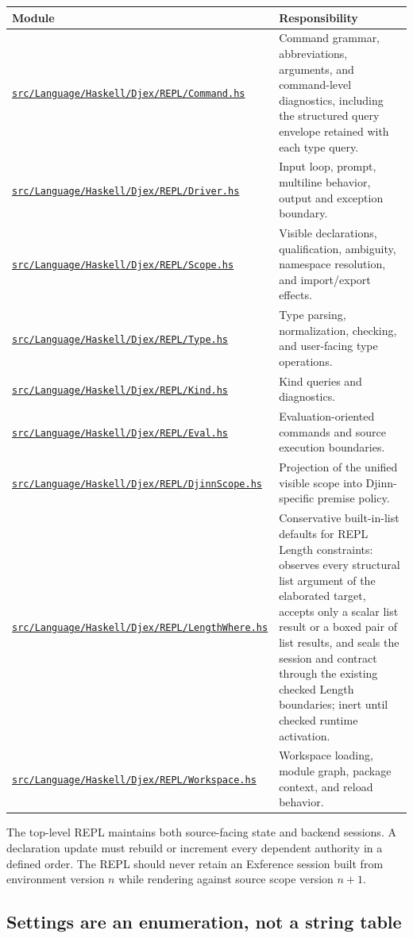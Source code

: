 \documentclass[10pt,letterpaper,oneside]{report}
\newcommand{\code}[1]{\texttt{\detokenize{#1}}}
\def\DjexBase{https://github.com/VladimirReshetnikov/Djex/blob/e454757d53ec057238c22fc6cd0d935b7d96b3dc/}
\newcommand{\dpath}[1]{\href{\DjexBase#1}{\nolinkurl{#1}}}
\begin{document}
\begin{longtable}{@{}L{0.31\textwidth}L{0.61\textwidth}@{}}
\toprule
\textbf{Module} & \textbf{Responsibility} \\
\midrule
\endhead
\dpath{src/Language/Haskell/Djex/REPL/Command.hs} & Command grammar, abbreviations, arguments, and command-level diagnostics, including the structured \code{-{}-where CLAUSE -{}- TYPE} query envelope retained with each type query. \\
\dpath{src/Language/Haskell/Djex/REPL/Driver.hs} & Input loop, prompt, multiline behavior, output and exception boundary. \\
\dpath{src/Language/Haskell/Djex/REPL/Scope.hs} & Visible declarations, qualification, ambiguity, namespace resolution, and import/export effects. \\
\dpath{src/Language/Haskell/Djex/REPL/Type.hs} & Type parsing, normalization, checking, and user-facing type operations. \\
\dpath{src/Language/Haskell/Djex/REPL/Kind.hs} & Kind queries and diagnostics. \\
\dpath{src/Language/Haskell/Djex/REPL/Eval.hs} & Evaluation-oriented commands and source execution boundaries. \\
\dpath{src/Language/Haskell/Djex/REPL/DjinnScope.hs} & Projection of the unified visible scope into Djinn-specific premise policy. \\
\dpath{src/Language/Haskell/Djex/REPL/LengthWhere.hs} & Conservative built-in-list defaults for REPL Length constraints: observes every structural list argument of the elaborated target, accepts only a scalar list result or a boxed pair of list results, and seals the session and contract through the existing checked Length boundaries; inert until checked runtime activation. \\
\dpath{src/Language/Haskell/Djex/REPL/Workspace.hs} & Workspace loading, module graph, package context, and reload behavior. \\
\bottomrule
\end{longtable}

The top-level REPL maintains both source-facing state and backend sessions. A declaration update must rebuild or increment every dependent authority in a defined order. The REPL should never retain an Exference session built from environment version \(n\) while rendering against source scope version \(n+1\).

\subsection{Settings are an enumeration, not a string table}
\end{document}
